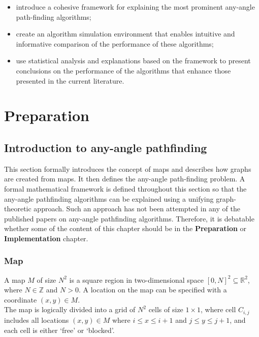 \documentclass[12pt,notitlepage]{report}
\begin{document}
\begin{itemize}
\item introduce a cohesive framework for explaining the most prominent any-angle path-finding algorithms;
\item create an algorithm simulation environment that enables intuitive and informative comparison of the performance of these algorithms;
\item use statistical analysis and explanations based on the framework to present conclusions on the performance of the algorithms that enhance those presented in the current literature.
\end {itemize}

\cleardoublepage


\chapter{Preparation} 

\section{Introduction to any-angle pathfinding}

This section formally introduces the concept of maps and describes how graphs are created from maps. It then defines the any-angle path-finding problem. A formal mathematical framework is defined throughout this section so that the any-angle pathfinding algorithms can be explained using a unifying graph-theoretic approach. Such an approach has not been attempted in any of the published papers on any-angle pathfinding algorithms. Therefore, it is debatable whether some of the content of this chapter should be in the {\bfseries Preparation} or {\bfseries Implementation} chapter.

\subsection{Map}

A map $M$ of size $N^{2}$ is a square region in two-dimensional space $[0,N]^{2} \subseteq \mathbb{R}^{2}$, where $N \in\mathbb{Z}$ and $N > 0$. A location on the map can be specified with a coordinate $(x,y) \in M$.\\

\noindent
The map is logically divided into a grid of $N^{2}$ cells of size $1 \times 1$, where cell $C_{i,j}$ includes all locations $(x,y) \in M$ where $i \leq x \leq i+1$ and $j \leq y \leq j+1$, and each cell is either `free' or `blocked'.\\
\end{document}
